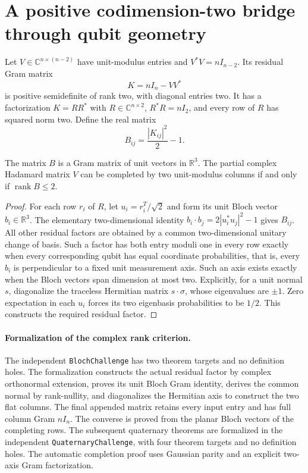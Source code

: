 \section{A positive codimension-two bridge through qubit geometry}
Let $V\in\mathbb C^{n\times(n-2)}$ have unit-modulus entries and
$V^*V=nI_{n-2}$. Its residual Gram matrix
\[
 K=nI_n-VV^*
\]
is positive semidefinite of rank two, with diagonal entries two.
It has a factorization $K=RR^*$ with $R\in\mathbb C^{n\times2}$,
$R^*R=nI_2$, and every row of $R$ has squared norm two.
Define the real matrix
\[
 B_{ij}=\frac{|K_{ij}|^2}{2}-1.
\]

\begin{theorem}
The matrix $B$ is a Gram matrix of unit vectors in $\mathbb R^3$.
The partial complex Hadamard matrix $V$ can be completed by two
unit-modulus columns if and only if $\operatorname{rank}B\le2$.
\end{theorem}
\begin{proof}
For each row $r_i$ of $R$, let $u_i=r_i^T/\sqrt2$ and form its unit
Bloch vector $b_i\in\mathbb R^3$. The elementary two-dimensional
identity $b_i\cdot b_j=2|u_i^*u_j|^2-1$ gives $B_{ij}$.
All other residual factors are obtained by a common two-dimensional
unitary change of basis. Such a factor has both entry moduli one
in every row exactly when every corresponding qubit has equal
coordinate probabilities, that is, every $b_i$ is perpendicular to
a fixed unit measurement axis. Such an axis exists exactly when
the Bloch vectors span dimension at most two. Explicitly, for a
unit normal $s$, diagonalize the traceless Hermitian matrix
$s\cdot\sigma$, whose eigenvalues are $\pm1$. Zero expectation in
each $u_i$ forces its two eigenbasis probabilities to be $1/2$.
This constructs the required residual factor.
\end{proof}

\paragraph{Formalization of the complex rank criterion.}
The independent \texttt{BlochChallenge} has two theorem targets and no
definition holes. The formalization constructs the actual residual
factor by complex orthonormal extension, proves its unit Bloch Gram
identity, derives the common normal by rank-nullity, and diagonalizes
the Hermitian axis to construct the two flat columns. The final
appended matrix retains every input entry and has full column Gram
$nI_n$. The converse is proved from the planar Bloch vectors of the
completing rows. The subsequent quaternary theorems are formalized in the independent
\texttt{QuaternaryChallenge}, with four theorem targets and no
definition holes. The automatic completion proof uses Gaussian parity
and an explicit two-axis Gram factorization.

